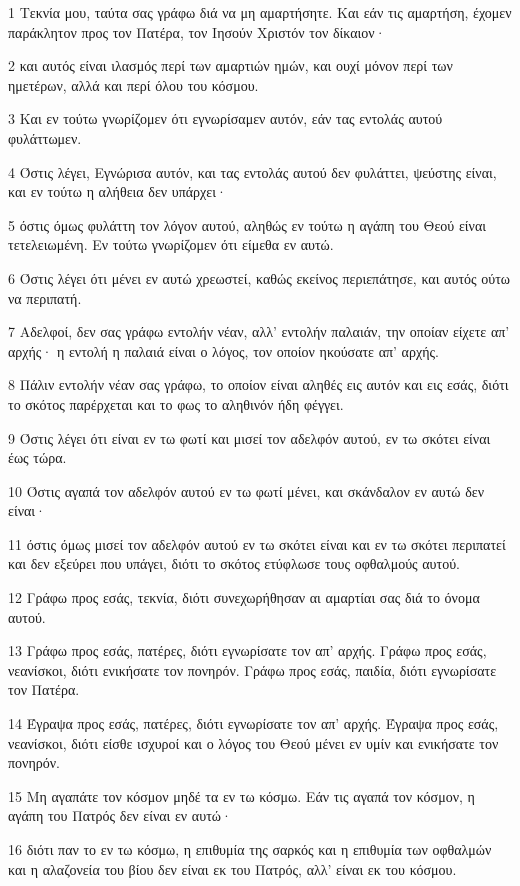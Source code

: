 \par 1 Τεκνία μου, ταύτα σας γράφω διά να μη αμαρτήσητε. Και εάν τις αμαρτήση, έχομεν παράκλητον προς τον Πατέρα, τον Ιησούν Χριστόν τον δίκαιον·
\par 2 και αυτός είναι ιλασμός περί των αμαρτιών ημών, και ουχί μόνον περί των ημετέρων, αλλά και περί όλου του κόσμου.
\par 3 Και εν τούτω γνωρίζομεν ότι εγνωρίσαμεν αυτόν, εάν τας εντολάς αυτού φυλάττωμεν.
\par 4 Όστις λέγει, Εγνώρισα αυτόν, και τας εντολάς αυτού δεν φυλάττει, ψεύστης είναι, και εν τούτω η αλήθεια δεν υπάρχει·
\par 5 όστις όμως φυλάττη τον λόγον αυτού, αληθώς εν τούτω η αγάπη του Θεού είναι τετελειωμένη. Εν τούτω γνωρίζομεν ότι είμεθα εν αυτώ.
\par 6 Όστις λέγει ότι μένει εν αυτώ χρεωστεί, καθώς εκείνος περιεπάτησε, και αυτός ούτω να περιπατή.
\par 7 Αδελφοί, δεν σας γράφω εντολήν νέαν, αλλ' εντολήν παλαιάν, την οποίαν είχετε απ' αρχής· η εντολή η παλαιά είναι ο λόγος, τον οποίον ηκούσατε απ' αρχής.
\par 8 Πάλιν εντολήν νέαν σας γράφω, το οποίον είναι αληθές εις αυτόν και εις εσάς, διότι το σκότος παρέρχεται και το φως το αληθινόν ήδη φέγγει.
\par 9 Όστις λέγει ότι είναι εν τω φωτί και μισεί τον αδελφόν αυτού, εν τω σκότει είναι έως τώρα.
\par 10 Όστις αγαπά τον αδελφόν αυτού εν τω φωτί μένει, και σκάνδαλον εν αυτώ δεν είναι·
\par 11 όστις όμως μισεί τον αδελφόν αυτού εν τω σκότει είναι και εν τω σκότει περιπατεί και δεν εξεύρει που υπάγει, διότι το σκότος ετύφλωσε τους οφθαλμούς αυτού.
\par 12 Γράφω προς εσάς, τεκνία, διότι συνεχωρήθησαν αι αμαρτίαι σας διά το όνομα αυτού.
\par 13 Γράφω προς εσάς, πατέρες, διότι εγνωρίσατε τον απ' αρχής. Γράφω προς εσάς, νεανίσκοι, διότι ενικήσατε τον πονηρόν. Γράφω προς εσάς, παιδία, διότι εγνωρίσατε τον Πατέρα.
\par 14 Έγραψα προς εσάς, πατέρες, διότι εγνωρίσατε τον απ' αρχής. Έγραψα προς εσάς, νεανίσκοι, διότι είσθε ισχυροί και ο λόγος του Θεού μένει εν υμίν και ενικήσατε τον πονηρόν.
\par 15 Μη αγαπάτε τον κόσμον μηδέ τα εν τω κόσμω. Εάν τις αγαπά τον κόσμον, η αγάπη του Πατρός δεν είναι εν αυτώ·
\par 16 διότι παν το εν τω κόσμω, η επιθυμία της σαρκός και η επιθυμία των οφθαλμών και η αλαζονεία του βίου δεν είναι εκ του Πατρός, αλλ' είναι εκ του κόσμου.
